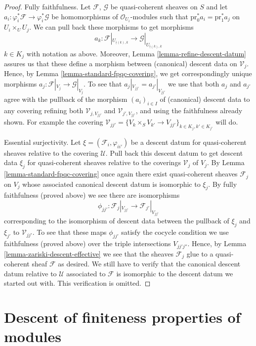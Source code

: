 \begin{proof}
\medskip\noindent
Fully faithfulness. Let $\mathcal{F}$, $\mathcal{G}$ be quasi-coherent
sheaves on $S$ and let
$a_i : \varphi_i^*\mathcal{F} \to \varphi_i^*\mathcal{G}$ be
homomorphisms of $\mathcal{O}_{U_i}$-modules such that
$\text{pr}_0^*a_i = \text{pr}_1^*a_j$ on $U_i \times_U U_j$.
We can pull back these morphisms to get morphisms
$$
a_k :
\mathcal{F}|_{U_{\underline{i}(k), k}}
\longrightarrow
\mathcal{G}|_{U_{\underline{i}(k), k}}
$$
$k \in K_j$ with notation as above. Moreover,
Lemma \ref{lemma-refine-descent-datum} assures us
that these define a morphism between (canonical) descent data on
$\mathcal{V}_j$. Hence, by
Lemma \ref{lemma-standard-fpqc-covering}, we get correspondingly
unique morphisms $a_j : \mathcal{F}|_{V_j} \to \mathcal{G}|_{V_j}$.
To see that $a_j|_{V_{jj'}} = a_{j'}|_{V_{jj'}}$ we use that
both $a_j$ and $a_{j'}$ agree with the pullback of the morphism
$(a_i)_{i \in I}$ of (canonical) descent data to any covering
refining both $\mathcal{V}_{j, V_{jj'}}$ and
$\mathcal{V}_{j', V_{jj'}}$, and using the faithfulness already
shown. For example the covering
$\mathcal{V}_{jj'} =
\{V_k \times_S V_{k'} \to V_{jj'}\}_{k \in K_j, k' \in K_{j'}}$
will do.

\medskip\noindent
Essential surjectivity. Let $\xi = (\mathcal{F}_i, \varphi_{ii'})$
be a descent datum for quasi-coherent sheaves relative to the covering
$\mathcal{U}$. Pull back this descent datum to get descent data
$\xi_j$ for quasi-coherent sheaves relative to the coverings
$\mathcal{V}_j$ of $V_j$. By Lemma \ref{lemma-standard-fpqc-covering}
once again there exist
quasi-coherent sheaves $\mathcal{F}_j$ on $V_j$ whose associated
canonical descent datum is isomorphic to $\xi_j$. By fully faithfulness
(proved above) we see there are isomorphisms
$$
\phi_{jj'} :
\mathcal{F}_j|_{V_{jj'}}
\longrightarrow
\mathcal{F}_{j'}|_{V_{jj'}}
$$
corresponding to the isomorphism of descent data between the pullback
of $\xi_j$ and $\xi_{j'}$ to $\mathcal{V}_{jj'}$. To see that these
maps $\phi_{jj'}$ satisfy the cocycle condition we use faithfulness
(proved above) over the triple intersections $V_{jj'j''}$. Hence, by
Lemma \ref{lemma-zariski-descent-effective}
we see that the sheaves $\mathcal{F}_j$
glue to a quasi-coherent sheaf $\mathcal{F}$ as desired.
We still have to verify that the canonical descent datum relative to
$\mathcal{U}$ associated to $\mathcal{F}$ is isomorphic to the descent
datum we started out with. This verification is omitted.
\end{proof}


\section{Descent of finiteness properties of modules}
\label{section-descent-finiteness}

